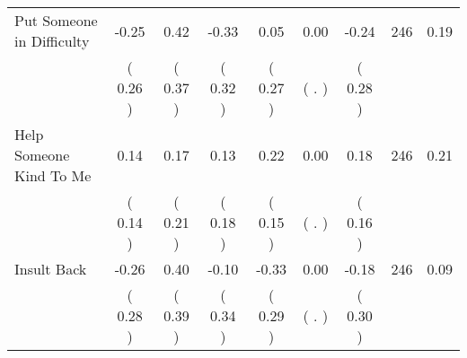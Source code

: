 \begin{tabular}{lcccccccc}
Put Someone in Difficulty &     -0.25 &      0.42 &     -0.33 &      0.05 &      0.00 &     -0.24 & 246 &       0.19 \\ 
 & (     0.26 ) & (     0.37 ) & (     0.32 ) & (     0.27 ) & (        . ) & (     0.28 ) & \\
Help Someone Kind To Me &      0.14 &      0.17 &      0.13 &      0.22 &      0.00 &      0.18 & 246 &       0.21 \\ 
 & (     0.14 ) & (     0.21 ) & (     0.18 ) & (     0.15 ) & (        . ) & (     0.16 ) & \\
Insult Back &     -0.26 &      0.40 &     -0.10 &     -0.33 &      0.00 &     -0.18 & 246 &       0.09 \\ 
 & (     0.28 ) & (     0.39 ) & (     0.34 ) & (     0.29 ) & (        . ) & (     0.30 ) & \\
\bottomrule
\end{tabular}
